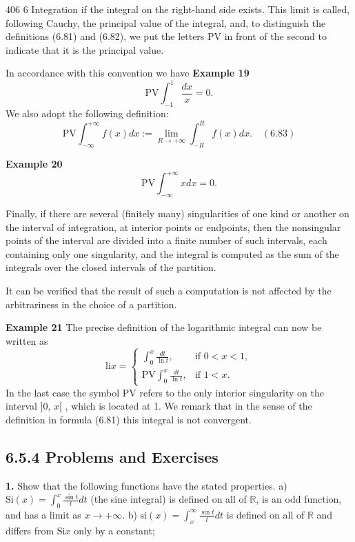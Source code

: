 406
\hfill 6 Integration
if the integral on the right-hand side exists. This limit is called, following Cauchy,
the principal value of the integral, and, to distinguish the definitions (6.81) and
(6.82), we put the letters PV in front of the second to indicate that it is the principal
value.

In accordance with this convention we have
\textbf{Example 19}
$$
\text{PV} \int_{-1}^{1} \frac{dx}{x} = 0.
$$
We also adopt the following definition:
$$
\text{PV} \int_{-\infty}^{+\infty} f(x)dx := \lim_{R \to +\infty} \int_{-R}^{R} f(x)dx. \quad (6.83)
$$

\textbf{Example 20}
$$
\text{PV} \int_{-\infty}^{+\infty} x dx = 0.
$$

Finally, if there are several (finitely many) singularities of one kind or another on
the interval of integration, at interior points or endpoints, then the nonsingular points
of the interval are divided into a finite number of such intervals, each containing
only one singularity, and the integral is computed as the sum of the integrals over
the closed intervals of the partition.

It can be verified that the result of such a computation is not affected by the
arbitrariness in the choice of a partition.

\textbf{Example 21} The precise definition of the logarithmic integral can now be written
as
$$
\text{li}x = \begin{cases} \int_{0}^{x} \frac{dt}{\ln t}, & \text{if } 0 < x < 1, \\ \text{PV} \int_{0}^{x} \frac{dt}{\ln t}, & \text{if } 1 < x. \end{cases}
$$
In the last case the symbol PV refers to the only interior singularity on the interval
]0, $x$[ , which is located at 1. We remark that in the sense of the definition in formula
(6.81) this integral is not convergent.

\subsection{6.5.4 Problems and Exercises}
\textbf{1.} Show that the following functions have the stated properties.
a) $\text{Si}(x) = \int_{0}^{x} \frac{\sin t}{t} dt$ (the sine integral) is defined on all of $\mathbb{R}$, is an odd function,
and has a limit as $x \to +\infty$.
b) $\text{si}(x) = \int_{x}^{\infty} \frac{\sin t}{t} dt$ is defined on all of $\mathbb{R}$ and differs from $\text{Si}x$ only by a
constant;